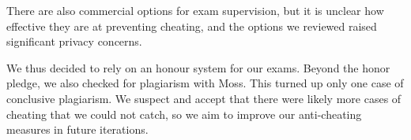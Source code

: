 There are also commercial options for exam supervision,
but it is unclear how effective they are at preventing cheating, and the options we reviewed raised significant privacy concerns.

We thus decided to rely on an honour system for our exams.
Beyond the honor pledge,
we also checked for plagiarism with Moss.
This turned up only one case of conclusive plagiarism.
We suspect and accept that there were likely more cases of cheating that we could not catch,
so we aim to improve our anti-cheating measures in future iterations.
